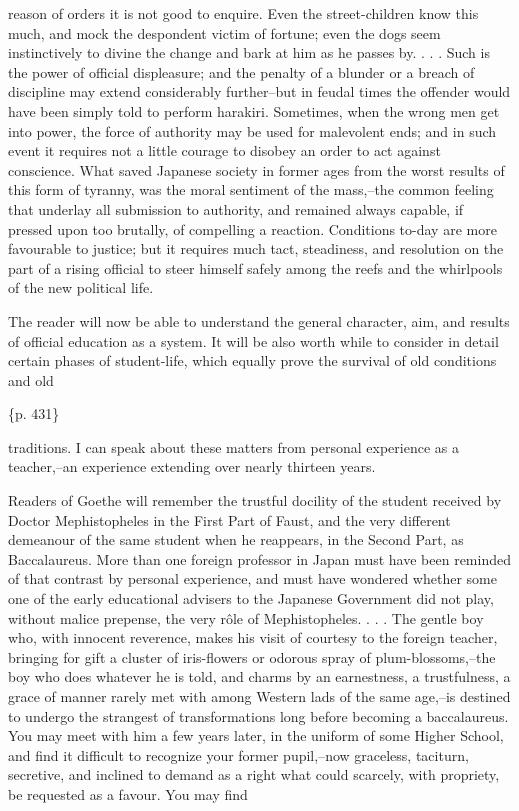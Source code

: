 reason of orders it is not good to enquire. Even the street-children know this much, and mock the despondent victim of fortune; even the dogs seem instinctively to divine the change and bark at him as he passes by. . . . Such is the power of official displeasure; and the penalty of a blunder or a breach of discipline may extend considerably further--but in feudal times the offender would have been simply told to perform harakiri. Sometimes, when the wrong men get into power, the force of authority may be used for malevolent ends; and in such event it requires not a little courage to disobey an order to act against conscience. What saved Japanese society in former ages from the worst results of this form of tyranny, was the moral sentiment of the mass,--the common feeling that underlay all submission to authority, and remained always capable, if pressed upon too brutally, of compelling a reaction. Conditions to-day are more favourable to justice; but it requires much tact, steadiness, and resolution on the part of a rising official to steer himself safely among the reefs and the whirlpools of the new political life.

The reader will now be able to understand the general character, aim, and results of official education as a system. It will be also worth while to consider in detail certain phases of student-life, which equally prove the survival of old conditions and old

\{p. 431\}

traditions. I can speak about these matters from personal experience as a teacher,--an experience extending over nearly thirteen years.



Readers of Goethe will remember the trustful docility of the student received by Doctor Mephistopheles in the First Part of Faust, and the very different demeanour of the same student when he reappears, in the Second Part, as Baccalaureus. More than one foreign professor in Japan must have been reminded of that contrast by personal experience, and must have wondered whether some one of the early educational advisers to the Japanese Government did not play, without malice prepense, the very rôle of Mephistopheles. . . . The gentle boy who, with innocent reverence, makes his visit of courtesy to the foreign teacher, bringing for gift a cluster of iris-flowers or odorous spray of plum-blossoms,--the boy who does whatever he is told, and charms by an earnestness, a trustfulness, a grace of manner rarely met with among Western lads of the same age,--is destined to undergo the strangest of transformations long before becoming a baccalaureus. You may meet with him a few years later, in the uniform of some Higher School, and find it difficult to recognize your former pupil,--now graceless, taciturn, secretive, and inclined to demand as a right what could scarcely, with propriety, be requested as a favour. You may find

